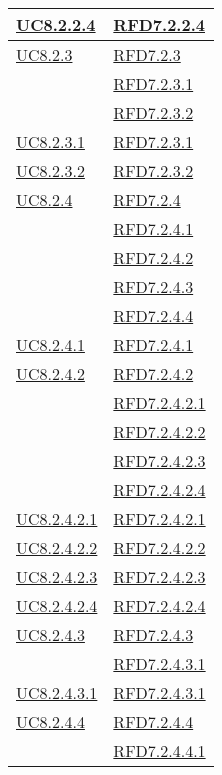 \begin{longtable}{|>{\centering}m{5cm}|m{5cm}<{\centering}|}
\hyperref[UC8.2.2.4]{UC8.2.2.4} & \hyperlink{RFD7.2.2.4}{RFD7.2.2.4}\\ \hline
\hyperref[UC8.2.3]{UC8.2.3} & \hyperlink{RFD7.2.3}{RFD7.2.3}\\
& \hyperlink{RFD7.2.3.1}{RFD7.2.3.1}\\
& \hyperlink{RFD7.2.3.2}{RFD7.2.3.2}\\ \hline
\hyperref[UC8.2.3.1]{UC8.2.3.1} & \hyperlink{RFD7.2.3.1}{RFD7.2.3.1}\\ \hline
\hyperref[UC8.2.3.2]{UC8.2.3.2} & \hyperlink{RFD7.2.3.2}{RFD7.2.3.2}\\ \hline
\hyperref[UC8.2.4]{UC8.2.4} & \hyperlink{RFD7.2.4}{RFD7.2.4}\\
& \hyperlink{RFD7.2.4.1}{RFD7.2.4.1}\\
& \hyperlink{RFD7.2.4.2}{RFD7.2.4.2}\\
& \hyperlink{RFD7.2.4.3}{RFD7.2.4.3}\\
& \hyperlink{RFD7.2.4.4}{RFD7.2.4.4}\\ \hline
\hyperref[UC8.2.4.1]{UC8.2.4.1} & \hyperlink{RFD7.2.4.1}{RFD7.2.4.1}\\ \hline
\hyperref[UC8.2.4.2]{UC8.2.4.2} & \hyperlink{RFD7.2.4.2}{RFD7.2.4.2}\\
& \hyperlink{RFD7.2.4.2.1}{RFD7.2.4.2.1}\\
& \hyperlink{RFD7.2.4.2.2}{RFD7.2.4.2.2}\\
& \hyperlink{RFD7.2.4.2.3}{RFD7.2.4.2.3}\\
& \hyperlink{RFD7.2.4.2.4}{RFD7.2.4.2.4}\\ \hline
\hyperref[UC8.2.4.2.1]{UC8.2.4.2.1} & \hyperlink{RFD7.2.4.2.1}{RFD7.2.4.2.1}\\ \hline
\hyperref[UC8.2.4.2.2]{UC8.2.4.2.2} & \hyperlink{RFD7.2.4.2.2}{RFD7.2.4.2.2}\\ \hline
\hyperref[UC8.2.4.2.3]{UC8.2.4.2.3} & \hyperlink{RFD7.2.4.2.3}{RFD7.2.4.2.3}\\ \hline
\hyperref[UC8.2.4.2.4]{UC8.2.4.2.4} & \hyperlink{RFD7.2.4.2.4}{RFD7.2.4.2.4}\\ \hline
\hyperref[UC8.2.4.3]{UC8.2.4.3} & \hyperlink{RFD7.2.4.3}{RFD7.2.4.3}\\
& \hyperlink{RFD7.2.4.3.1}{RFD7.2.4.3.1}\\ \hline
\hyperref[UC8.2.4.3.1]{UC8.2.4.3.1} & \hyperlink{RFD7.2.4.3.1}{RFD7.2.4.3.1}\\ \hline
\hyperref[UC8.2.4.4]{UC8.2.4.4} & \hyperlink{RFD7.2.4.4}{RFD7.2.4.4}\\
& \hyperlink{RFD7.2.4.4.1}{RFD7.2.4.4.1}\\

\end{longtable}
